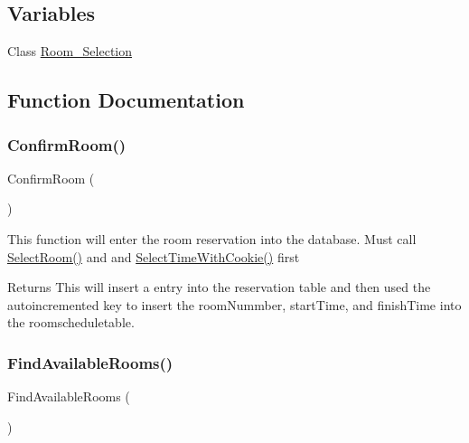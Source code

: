 \subsection*{Variables}
\begin{DoxyCompactItemize}
\item 
Class \mbox{\hyperlink{_room___selection_8class_8php_a6a9e0231c1dcb7e02782a437b45af63a}{Room\+\_\+\+Selection}}
\end{DoxyCompactItemize}


\subsection{Function Documentation}
\mbox{\label{_room___selection_8class_8php_a0e67cda8ce5c20c885c55a2b7eaf478c}} 
\subsubsection{\texorpdfstring{ConfirmRoom()}{ConfirmRoom()}}
{\footnotesize\ttfamily Confirm\+Room (\begin{DoxyParamCaption}{ }\end{DoxyParamCaption})}

This function will enter the room reservation into the database. Must call \mbox{\hyperlink{_room___selection_8class_8php_a15f7f352af1caf97b352f4db79d5c932}{Select\+Room()}} and and \mbox{\hyperlink{_room___selection_8class_8php_a0df97fd941faa49c5932879ede080944}{Select\+Time\+With\+Cookie()}} first \begin{DoxyReturn}{Returns}
This will insert a entry into the reservation table and then used the autoincremented key to insert the room\+Nummber, start\+Time, and finish\+Time into the roomscheduletable. 
\end{DoxyReturn}
\mbox{\label{_room___selection_8class_8php_a65dc1d8579dc730a5a4db6799c7fde4a}} 
\subsubsection{\texorpdfstring{FindAvailableRooms()}{FindAvailableRooms()}}
{\footnotesize\ttfamily Find\+Available\+Rooms (\begin{DoxyParamCaption}{ }\end{DoxyParamCaption})}

